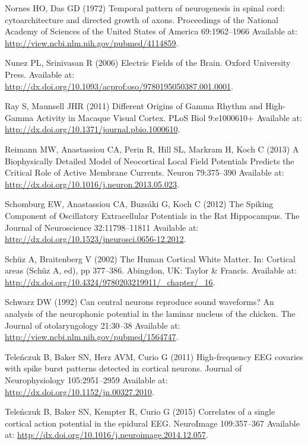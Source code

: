 \documentclass[]{article}
\begin{document}
\hypertarget{ref-Nornes1972Temporal}{}
Nornes HO, Das GD (1972) Temporal pattern of neurogenesis in spinal
cord: cytoarchitecture and directed growth of axons. Proceedings of the
National Academy of Sciences of the United States of America
69:1962--1966 Available at:
\url{http://view.ncbi.nlm.nih.gov/pubmed/4114859}.

\hypertarget{ref-Nunez2006Electric}{}
Nunez PL, Srinivasan R (2006) Electric Fields of the Brain. Oxford
University Press. Available at:
\url{http://dx.doi.org/10.1093/acprof:oso/9780195050387.001.0001}.

\hypertarget{ref-Ray2011Different}{}
Ray S, Maunsell JHR (2011) Different Origins of Gamma Rhythm and
High-Gamma Activity in Macaque Visual Cortex. PLoS Biol 9:e1000610+
Available at: \url{http://dx.doi.org/10.1371/journal.pbio.1000610}.

\hypertarget{ref-Reimann2013Biophysically}{}
Reimann MW, Anastassiou CA, Perin R, Hill SL, Markram H, Koch C (2013) A
Biophysically Detailed Model of Neocortical Local Field Potentials
Predicts the Critical Role of Active Membrane Currents. Neuron
79:375--390 Available at:
\url{http://dx.doi.org/10.1016/j.neuron.2013.05.023}.

\hypertarget{ref-Schomburg2012Spiking}{}
Schomburg EW, Anastassiou CA, Buzsáki G, Koch C (2012) The Spiking
Component of Oscillatory Extracellular Potentials in the Rat
Hippocampus. The Journal of Neuroscience 32:11798--11811 Available at:
\url{http://dx.doi.org/10.1523/jneurosci.0656-12.2012}.

\hypertarget{ref-Schuz2002Human}{}
Schüz A, Braitenberg V (2002) The Human Cortical White Matter. In:
Cortical areas (Schüz A, ed), pp 377--386. Abingdon, UK: Taylor \&
Francis. Available at:
\url{http://dx.doi.org/10.4324/9780203219911/_chapter/_16}.

\hypertarget{ref-Schwarz1992Can}{}
Schwarz DW (1992) Can central neurons reproduce sound waveforms? An
analysis of the neurophonic potential in the laminar nucleus of the
chicken. The Journal of otolaryngology 21:30--38 Available at:
\url{http://view.ncbi.nlm.nih.gov/pubmed/1564747}.

\hypertarget{ref-Telenczuk2011Highfrequency}{}
Teleńczuk B, Baker SN, Herz AVM, Curio G (2011) High-frequency EEG
covaries with spike burst patterns detected in cortical neurons. Journal
of Neurophysiology 105:2951--2959 Available at:
\url{http://dx.doi.org/10.1152/jn.00327.2010}.

\hypertarget{ref-Telenczuk2015Correlates}{}
Teleńczuk B, Baker SN, Kempter R, Curio G (2015) Correlates of a single
cortical action potential in the epidural EEG. NeuroImage 109:357--367
Available at: \url{http://dx.doi.org/10.1016/j.neuroimage.2014.12.057}.
\end{document}
